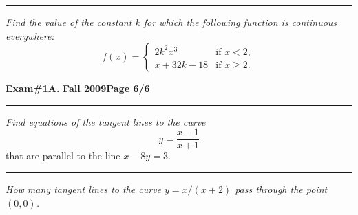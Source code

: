 \documentclass[12pt]{article}
\begin{document}
\vspace{3cm}
\hrule

{\problem[10 pts] \em Find the value of the constant $k$ for which the
  following function is continuous everywhere:} 
\begin{equation*}
f(x) = \begin{cases}
2k^2x^3 &\text{if }x<2, \\
x+32k-18 &\text{if }x \geq 2.
\end{cases}
\end{equation*}
\vspace{5cm}
\begin{flushright}
\end{flushright}

\newpage


\hfill{\large\bf Exam\#1A.}\hfill{\large\bf
  Fall 2009}\hfill{\large\bf Page 6/6}\hrule

\bigskip
{\problem[15 pts] \em Find equations of the tangent lines to the curve}
\begin{equation*}
  y = \frac{x-1}{x+1}
\end{equation*}
that are parallel to the line $x-8y=3$.
\vspace{8cm}
\hrule
{\problem[10 pts] \em How many tangent lines to the curve $y=x/(x+2)$
  pass through the point $(0,0)$.}      

\end{document}

